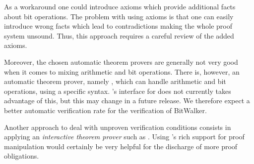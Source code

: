 As a workaround one could introduce axioms which provide
additional facts about bit operations. 
The problem with using axioms is that one can easily introduce wrong facts
which lead to contradictions making the whole proof system unsound. 
Thus, this approach requires a careful review of the added axioms.

Moreover, the chosen automatic theorem provers are generally not very
good when it comes to mixing arithmetic and bit operations.
There is, however, an automatic theorem prover, namely \z,
which can handle arithmetic and bit operations, using a specific syntax.
\framac's interface for \z does not currently takes advantage of this, 
but this may change in a future release.
We therefore expect a better automatic verification rate for the verification of BitWalker.

Another approach to deal with unproven verification conditions consists in
applying an \emph{interactive theorem prover} such as \coq.
Using \coq's rich support for proof manipulation would certainly be very helpful
for the discharge of more proof obligations.

